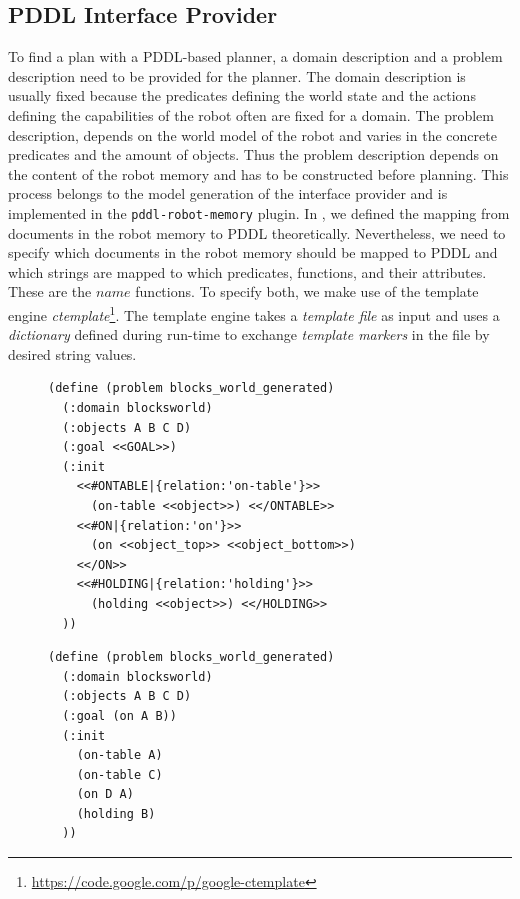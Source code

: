 \subsection{PDDL Interface Provider}
\label{sec:impl-pddl}
To find a plan with a PDDL-based planner, a domain description and a problem
description need to be provided for the planner. The domain description
is usually fixed because the predicates defining the world state and
the actions defining the capabilities of the robot often are fixed for
a domain. The problem description, depends on the world model of the
robot and varies in the concrete predicates and the amount of
objects. Thus the problem description depends on the content of the
robot memory and has to be constructed before planning. This process
belongs to the model generation of the interface provider and is implemented in the
\texttt{pddl-robot-memory} plugin. In , we
defined the mapping from documents in the robot memory
to PDDL theoretically. Nevertheless, we need to specify which documents in the robot
memory should be mapped to PDDL and which strings are mapped to which
predicates, functions, and their attributes. These are the $name$
functions. To specify both, we make use of the template engine
\emph{ctemplate}\footnote{\url{https://code.google.com/p/google-ctemplate}}.
The template engine takes a \emph{template file} as
input and uses a \emph{dictionary} defined during run-time to exchange
\emph{template markers} in the file by desired string values.
\begin{figure}
  \begin{minipage}{0.58\linewidth}
\begin{lstlisting}[style=SmallPDDL,
  caption={PDDL problem description template},
  label=lst:template,
  framexleftmargin=1pt, xleftmargin=1pt,
 morekeywords={}, numbers=none]
(define (problem blocks_world_generated)
  (:domain blocksworld)
  (:objects A B C D)
  (:goal <<GOAL>>)
  (:init
    <<#ONTABLE|{relation:'on-table'}>>
      (on-table <<object>>) <</ONTABLE>>
    <<#ON|{relation:'on'}>>
      (on <<object_top>> <<object_bottom>>)
    <</ON>>
    <<#HOLDING|{relation:'holding'}>>
      (holding <<object>>) <</HOLDING>>
  ))
\end{lstlisting}
  \end{minipage}
\hfill
  \begin{minipage}{0.42\linewidth}
\begin{lstlisting}[style=SmallPDDL,
  caption={Generated PDDL problem description},
  label=lst:pddl-gen,
  framexleftmargin=1pt, xleftmargin=1pt,
 morekeywords={}, numbers=none]
(define (problem blocks_world_generated)
  (:domain blocksworld)
  (:objects A B C D)
  (:goal (on A B))
  (:init
    (on-table A)
    (on-table C)
    (on D A)
    (holding B)
  ))
\end{lstlisting}
\vspace{0.3cm}
  \end{minipage}
  \vspace{-0.8cm}
\end{figure}
